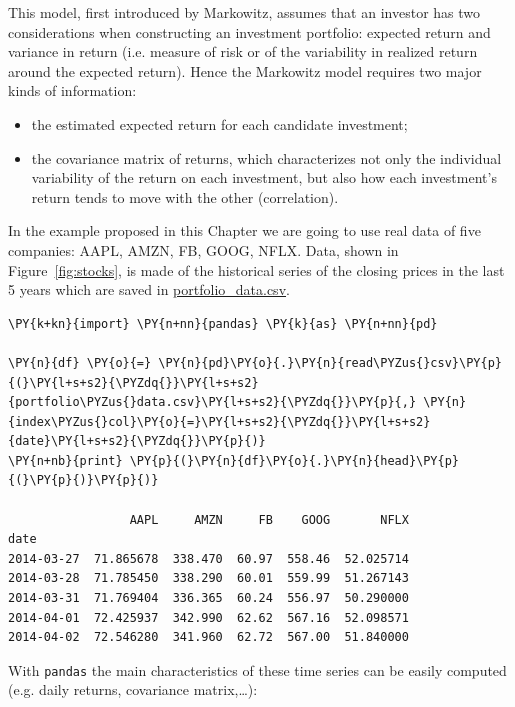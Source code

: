This model, first introduced by Markowitz, assumes that an investor has
two considerations when constructing an investment portfolio: expected
return and variance in return (i.e. measure of risk or of the
variability in realized return around the expected return). Hence the
Markowitz model requires two major kinds of information:

\begin{itemize}
\tightlist
\item
  the estimated expected return for each candidate investment;
\item
  the covariance matrix of returns, which characterizes not only the 
  individual variability of the return on each investment, 
  but also how each investment's return tends to move with the other (correlation).
\end{itemize}

In the example proposed in this Chapter we are going to use real data
of five companies:  AAPL, AMZN, FB, GOOG, NFLX.
Data, shown in Figure~\ref{fig:stocks}, is made of the historical 
series of the closing prices in the last 5 years which are saved in 
\href{https://drive.google.com/file/d/1srCzNlKVY_LHRpkaKoUynnmI0KImfT6Y/view?usp=sharing}{portfolio\_data.csv}.

\begin{tcolorbox}[breakable, size=fbox, boxrule=1pt, pad at break*=1mm,colback=cellbackground, colframe=cellborder]
\begin{Verbatim}[commandchars=\\\{\}]
\PY{k+kn}{import} \PY{n+nn}{pandas} \PY{k}{as} \PY{n+nn}{pd}
		
\PY{n}{df} \PY{o}{=} \PY{n}{pd}\PY{o}{.}\PY{n}{read\PYZus{}csv}\PY{p}{(}\PY{l+s+s2}{\PYZdq{}}\PY{l+s+s2}{portfolio\PYZus{}data.csv}\PY{l+s+s2}{\PYZdq{}}\PY{p}{,} \PY{n}{index\PYZus{}col}\PY{o}{=}\PY{l+s+s2}{\PYZdq{}}\PY{l+s+s2}{date}\PY{l+s+s2}{\PYZdq{}}\PY{p}{)}
\PY{n+nb}{print} \PY{p}{(}\PY{n}{df}\PY{o}{.}\PY{n}{head}\PY{p}{(}\PY{p}{)}\PY{p}{)}

                 AAPL     AMZN     FB    GOOG       NFLX
date
2014-03-27  71.865678  338.470  60.97  558.46  52.025714
2014-03-28  71.785450  338.290  60.01  559.99  51.267143
2014-03-31  71.769404  336.365  60.24  556.97  50.290000
2014-04-01  72.425937  342.990  62.62  567.16  52.098571
2014-04-02  72.546280  341.960  62.72  567.00  51.840000
\end{Verbatim}
\end{tcolorbox}

With \texttt{pandas} the main characteristics of these time series can
be easily computed (e.g. daily returns, covariance matrix,\ldots):


